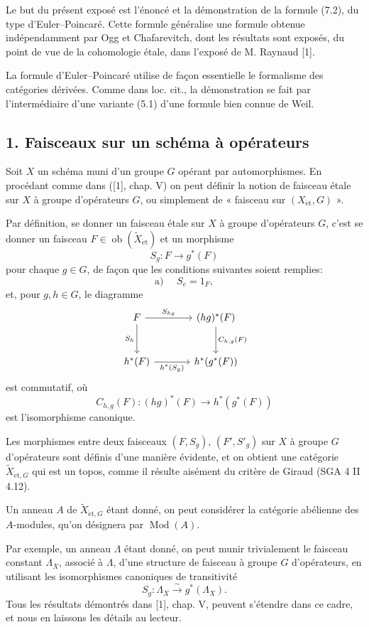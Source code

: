 \documentclass[11pt]{article}
\providecommand{\et}{\mathrm{\acute{e}t}}
\providecommand{\Ob}{\operatorname{ob}}
\providecommand{\Ob}{\operatorname{ob}}
\providecommand{\Ob}{\operatorname{Ob}}
\providecommand{\Mod}{\operatorname{Mod}}
\begin{document}
Le but du présent exposé est l'énoncé et la démonstration de la formule (7.2), du type d'Euler--Poincaré. Cette formule généralise une formule obtenue indépendamment par Ogg et Chafarevitch, dont les résultats sont exposés, du point de vue de la cohomologie étale, dans l'exposé de M. Raynaud [1].

La formule d'Euler--Poincaré utilise de façon essentielle le formalisme des catégories dérivées. Comme dans loc. cit., la démonstration se fait par l'intermédiaire d'une variante (5.1) d'une formule bien connue de Weil.

\subsection*{1. Faisceaux sur un schéma à opérateurs}

Soit $X$ un schéma muni d'un groupe $G$ opérant par automorphismes. En procédant comme dans ([1], chap. V) on peut définir la notion de faisceau étale sur $X$ à groupe d'opérateurs $G$, ou simplement de « faisceau sur $(X_{\et},G)$ ».

Par définition, se donner un faisceau étale sur $X$ à groupe d'opérateurs $G$, c'est se donner un faisceau $F\in \Ob(\widetilde X_{\et})$ et un morphisme
\[
S_g:F\longrightarrow g^*(F)
\]
pour chaque $g\in G$, de façon que les conditions suivantes soient remplies:
\[
\text{a) }\quad S_e=1_F,
\]
et, pour $g,h\in G$, le diagramme
\[
\begin{tikzcd}[column sep=large,row sep=large]
F \arrow[r,"S_{hg}"] \arrow[d,"S_h"'] & (hg)^*(F) \arrow[d,"C_{h,g}(F)"]\\
h^*(F) \arrow[r,"h^*(S_g)"'] & h^*(g^*(F))
\end{tikzcd}
\]
est commutatif, où
\[
C_{h,g}(F):(hg)^*(F)\longrightarrow h^*(g^*(F))
\]
est l'isomorphisme canonique.

Les morphismes entre deux faisceaux $(F,S_g)$, $(F',S'_g)$ sur $X$ à groupe $G$ d'opérateurs sont définis d'une manière évidente, et on obtient une catégorie $\widetilde X_{\et,G}$ qui est un topos, comme il résulte aisément du critère de Giraud (SGA 4 II 4.12).

Un anneau $A$ de $\widetilde X_{\et,G}$ étant donné, on peut considérer la catégorie abélienne des $A$-modules, qu'on désignera par $\Mod(A)$.

Par exemple, un anneau $\Lambda$ étant donné, on peut munir trivialement le faisceau constant $\Lambda_X$, associé à $\Lambda$, d'une structure de faisceau à groupe $G$ d'opérateurs, en utilisant les isomorphismes canoniques de transitivité
\[
S_g:\Lambda_X\xrightarrow{\sim}g^*(\Lambda_X).
\]
Tous les résultats démontrés dans [1], chap. V, peuvent s'étendre dans ce cadre, et nous en laissons les détails au lecteur.
\end{document}
